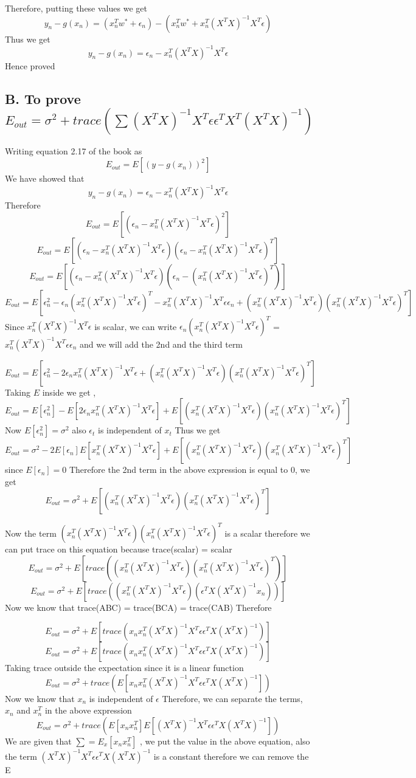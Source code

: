 \documentclass{article}
\newcommand{\gxn}[0]{x_n^T(X^TX)^{-1}X^T\epsilon}
\begin{document}
Therefore, putting these values we get 
$$y_n-g(x_n)=(x_n^Tw^* + \epsilon_n) - (x_n^Tw^*+x_n^T(X^TX)^{-1}X^T\epsilon)$$
Thus we  get 
$$y_n-g(x_n)=\epsilon_n - x_n^T(X^TX)^{-1}X^T\epsilon$$
Hence proved 
\subsection{B. To prove $E_{out}=\sigma^2+trace(\sum(X^TX)^{-1}X^T\epsilon\epsilon^TX^T(X^TX)^{-1})$}
Writing equation 2.17 of the book  as
$$E_{out} = E[(y-g(x_n))^2]$$
We have showed that 
$$y_n-g(x_n)=\epsilon_n - x_n^T(X^TX)^{-1}X^T\epsilon$$
Therefore
$$E_{out} = E[(\epsilon_n - x_n^T(X^TX)^{-1}X^T\epsilon)^2]$$
$$E_{out} = E[(\epsilon_n - x_n^T(X^TX)^{-1}X^T\epsilon)(\epsilon_n - x_n^T(X^TX)^{-1}X^T\epsilon)^T]$$
$$E_{out} = E[(\epsilon_n - x_n^T(X^TX)^{-1}X^T\epsilon)(\epsilon_n - (x_n^T(X^TX)^{-1}X^T\epsilon)^T)]$$
$$E_{out} = E[\epsilon_n^2 - \epsilon_n(\gxn)^T - \gxn\epsilon_n + (\gxn)(\gxn)^T]$$
Since $\gxn $ is scalar, we can write $\epsilon_n(\gxn)^T$ = $\gxn\epsilon_n$ and we will add the 2nd and the third term


$$E_{out} = E[\epsilon_n^2 - 2\epsilon_n\gxn  + (\gxn)(\gxn)^T]$$
Taking $E$ inside we get ,
$$E_{out} = E[\epsilon_n^2] - E[2\epsilon_n\gxn]  + E[(\gxn)(\gxn)^T]$$
Now $E[\epsilon_n^2] = \sigma^2$ also $\epsilon_t$ is independent of $x_t$ Thus we get 
$$E_{out} = \sigma^2 - 2E[\epsilon_n]E[\gxn]  + E[(\gxn)(\gxn)^T]$$
since $ E[\epsilon_n] = 0 $ Therefore the 2nd term in the above expression is equal to 0, we get 
$$E_{out} = \sigma^2 + E[(\gxn)(\gxn)^T]$$

Now the term $(\gxn)(\gxn)^T$ is a scalar therefore we can put trace on this equation because trace(scalar) = scalar
$$E_{out} = \sigma^2 + E[trace((\gxn)(\gxn)^T)]$$
$$E_{out} = \sigma^2 + E[trace((\gxn)(\epsilon^TX(X^TX)^{-1} x_n))]$$
Now we know that trace(ABC) = trace(BCA) = trace(CAB) Therefore

$$E_{out} = \sigma^2 + E[trace(x_n\gxn\epsilon^TX(X^TX)^{-1} )]$$
$$E_{out} = \sigma^2 + E[trace(x_n\gxn\epsilon^TX(X^TX)^{-1} )]$$
Taking trace outside the expectation since it is a linear function 
$$E_{out} = \sigma^2 + trace(E[x_n\gxn\epsilon^TX(X^TX)^{-1}])$$
Now we know that $x_n$ is independent of $\epsilon$ Therefore, we can separate the terms, $x_n$ and $x_n^T$ in the above expression
$$E_{out} = \sigma^2 + trace(E[x_nx_n^T]E[(X^TX)^{-1}X^T\epsilon\epsilon^TX(X^TX)^{-1}])$$
We are given that $\sum = E_x[x_nx_n^T]$ , we put the value in the above equation, also the term $(X^TX)^{-1}X^T\epsilon\epsilon^TX(X^TX)^{-1}$ is a constant therefore we can remove the E 
\end{document}
